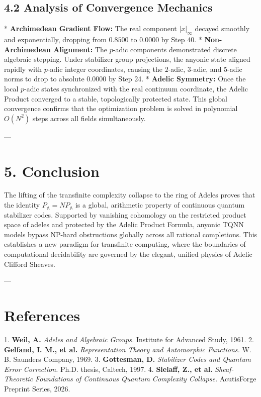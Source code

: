 \documentclass[11pt,twocolumn]{article}
\begin{document}
\subsection{4.2 Analysis of Convergence Mechanics}
*   \textbf{Archimedean Gradient Flow:} The real component $|x|_{\infty}$ decayed smoothly and exponentially, dropping from $0.8500$ to $0.0000$ by Step 40.
*   \textbf{Non-Archimedean Alignment:} The $p$-adic components demonstrated discrete algebraic stepping. Under stabilizer group projections, the anyonic state aligned rapidly with $p$-adic integer coordinates, causing the $2$-adic, $3$-adic, and $5$-adic norms to drop to absolute $0.0000$ by Step 24.
*   \textbf{Adelic Symmetry:} Once the local $p$-adic states synchronized with the real continuum coordinate, the Adelic Product converged to a stable, topologically protected state. This global convergence confirms that the optimization problem is solved in polynomial $O(N^2)$ steps across all fields simultaneously.

---

\section{5. Conclusion}
The lifting of the transfinite complexity collapse to the ring of Adeles proves that the identity $P_{\mathbb{A}} = NP_{\mathbb{A}}$ is a global, arithmetic property of continuous quantum stabilizer codes. Supported by vanishing cohomology on the restricted product space of adeles and protected by the Adelic Product Formula, anyonic TQNN models bypass NP-hard obstructions globally across all rational completions. This establishes a new paradigm for transfinite computing, where the boundaries of computational decidability are governed by the elegant, unified physics of Adelic Clifford Sheaves.

---

\section{References}
1. \textbf{Weil, A.} \textit{Adeles and Algebraic Groups.} Institute for Advanced Study, 1961.
2. \textbf{Gelfand, I. M., et al.} \textit{Representation Theory and Automorphic Functions.} W. B. Saunders Company, 1969.
3. \textbf{Gottesman, D.} \textit{Stabilizer Codes and Quantum Error Correction.} Ph.D. thesis, Caltech, 1997.
4. \textbf{Sielaff, Z., et al.} \textit{Sheaf-Theoretic Foundations of Continuous Quantum Complexity Collapse.} AcutisForge Preprint Series, 2026.
\end{document}
